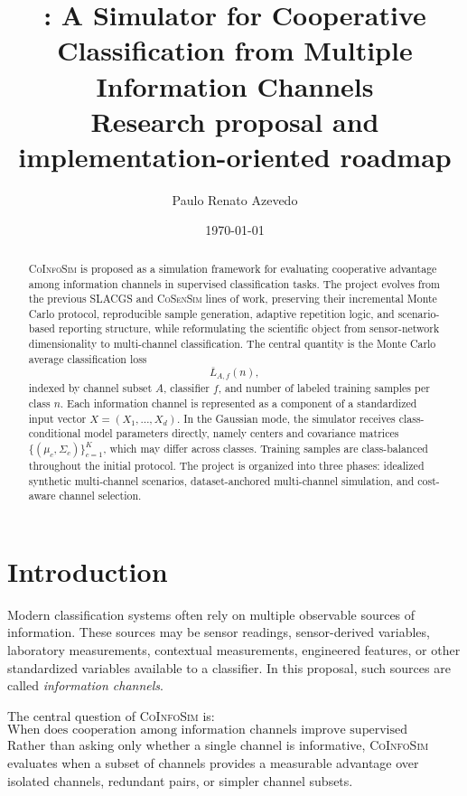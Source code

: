 \documentclass[11pt,a4paper]{article}
\title{\vspace{-1.2cm}\textbf{\CoInfoSim: A Simulator for Cooperative Classification from Multiple Information Channels}\\[0.35em]
\large Research proposal and implementation-oriented roadmap}
\author{Paulo Renato Azevedo}
\date{\today}
\newcommand{\CoInfoSim}{\textsc{CoInfoSim}}
\newcommand{\CoSenSim}{\textsc{CoSenSim}}
\newcommand{\SLACGS}{\textsc{SLACGS}}
\begin{document}
\maketitle

\begin{abstract}
\noindent
\CoInfoSim{} is proposed as a simulation framework for evaluating cooperative advantage among information channels in supervised classification tasks. The project evolves from the previous \SLACGS{} and \CoSenSim{} lines of work, preserving their incremental Monte Carlo protocol, reproducible sample generation, adaptive repetition logic, and scenario-based reporting structure, while reformulating the scientific object from sensor-network dimensionality to multi-channel classification. The central quantity is the Monte Carlo average classification loss
\[
    \overline{L}_{A,f}(n),
\]
indexed by channel subset $A$, classifier $f$, and number of labeled training samples per class $n$. Each information channel is represented as a component of a standardized input vector $X=(X_1,\ldots,X_d)$. In the Gaussian mode, the simulator receives class-conditional model parameters directly, namely centers and covariance matrices $\{(\mu_c,\Sigma_c)\}_{c=1}^{K}$, which may differ across classes. Training samples are class-balanced throughout the initial protocol. The project is organized into three phases: idealized synthetic multi-channel scenarios, dataset-anchored multi-channel simulation, and cost-aware channel selection.
\end{abstract}

\tableofcontents
\newpage

\section{Introduction}

Modern classification systems often rely on multiple observable sources of information. These sources may be sensor readings, sensor-derived variables, laboratory measurements, contextual measurements, engineered features, or other standardized variables available to a classifier. In this proposal, such sources are called \emph{information channels}.

The central question of \CoInfoSim{} is:
\[
    \text{When does cooperation among information channels improve supervised classification?}
\]
Rather than asking only whether a single channel is informative, \CoInfoSim{} evaluates when a subset of channels provides a measurable advantage over isolated channels, redundant pairs, or simpler channel subsets.
\end{document}
